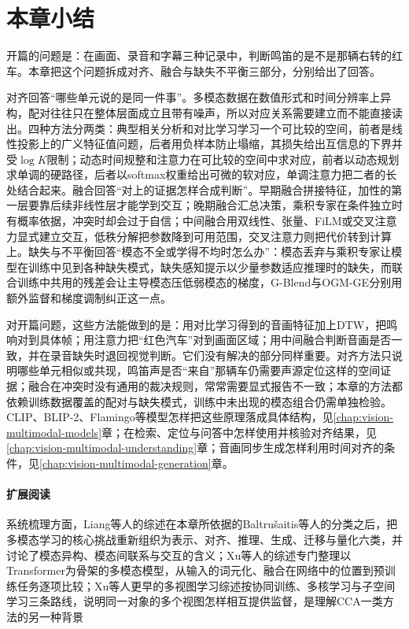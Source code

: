 \section{本章小结}
\label{sec:vision-alignment-summary}

开篇的问题是：在画面、录音和字幕三种记录中，判断鸣笛的是不是那辆右转的红车。本章把这个问题拆成对齐、融合与缺失不平衡三部分，分别给出了回答。

对齐回答“哪些单元说的是同一件事”。多模态数据在数值形式和时间分辨率上异构，配对往往只在整体层面成立且带有噪声，所以对应关系需要建立而不能直接读出。四种方法分两类：典型相关分析和对比学习学习一个可比较的空间，前者是线性投影上的广义特征值问题，后者用负样本防止塌缩，其损失给出互信息的下界并受$\log K$限制；动态时间规整和注意力在可比较的空间中求对应，前者以动态规划求单调的硬路径，后者以softmax权重给出可微的软对应，单调注意力把二者的长处结合起来。融合回答“对上的证据怎样合成判断”。早期融合拼接特征，加性的第一层要靠后续非线性层才能学到交互；晚期融合汇总决策，乘积专家在条件独立时有概率依据，冲突时却会过于自信；中间融合用双线性、张量、FiLM或交叉注意力显式建立交互，低秩分解把参数降到可用范围，交叉注意力则把代价转到计算上。缺失与不平衡回答“模态不全或学得不均时怎么办”：模态丢弃与乘积专家让模型在训练中见到各种缺失模式，缺失感知提示以少量参数适应推理时的缺失，而联合训练中共用的残差会让主导模态压低弱模态的梯度，G-Blend与OGM-GE分别用额外监督和梯度调制纠正这一点。

对开篇问题，这些方法能做到的是：用对比学习得到的音画特征加上DTW，把鸣响对到具体帧；用注意力把“红色汽车”对到画面区域；用中间融合判断音画是否一致，并在录音缺失时退回视觉判断。它们没有解决的部分同样重要。对齐方法只说明哪些单元相似或共现，鸣笛声是否“来自”那辆车仍需要声源定位这样的空间证据；融合在冲突时没有通用的裁决规则，常常需要显式报告不一致；本章的方法都依赖训练数据覆盖的配对与缺失模式，训练中未出现的模态组合仍需单独检验。CLIP、BLIP-2、Flamingo等模型怎样把这些原理落成具体结构，见\ref{chap:vision-multimodal-models}章；在检索、定位与问答中怎样使用并核验对齐结果，见\ref{chap:vision-multimodal-understanding}章；音画同步生成怎样利用时间对齐的条件，见\ref{chap:vision-multimodal-generation}章。

\paragraph{扩展阅读}
系统梳理方面，Liang等人的综述在本章所依据的Baltrušaitis等人的分类之后，把多模态学习的核心挑战重新组织为表示、对齐、推理、生成、迁移与量化六类，并讨论了模态异构、模态间联系与交互的含义；Xu等人的综述专门整理以Transformer为骨架的多模态模型，从输入的词元化、融合在网络中的位置到预训练任务逐项比较；Xu等人更早的多视图学习综述按协同训练、多核学习与子空间学习三条路线，说明同一对象的多个视图怎样相互提供监督，是理解CCA一类方法的另一种背景


